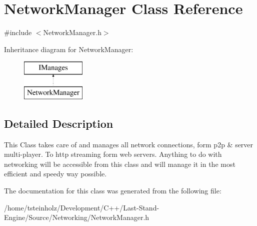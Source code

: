 \hypertarget{classNetworkManager}{}\section{Network\+Manager Class Reference}
\label{classNetworkManager}


{\ttfamily \#include $<$Network\+Manager.\+h$>$}

Inheritance diagram for Network\+Manager\+:\begin{figure}[H]
\begin{center}
\leavevmode
\includegraphics[height=2.000000cm]{classNetworkManager}
\end{center}
\end{figure}


\subsection{Detailed Description}
This Class takes care of and manages all network connections, form p2p \& server multi-\/player. To http streaming form web servers. Anything to do with networking will be accessible from this class and will manage it in the most efficient and speedy way possible. 

The documentation for this class was generated from the following file\+:\begin{DoxyCompactItemize}
\item 
/home/tsteinholz/\+Development/\+C++/\+Last-\/\+Stand-\/\+Engine/\+Source/\+Networking/Network\+Manager.\+h\end{DoxyCompactItemize}
